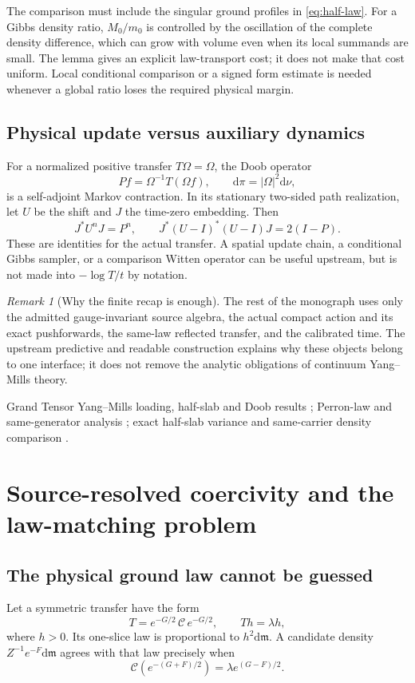 \documentclass[11pt,oneside,openany]{book}
\theoremstyle{definition}
\theoremstyle{remark}
\newtheorem{remark}[remark]{Remark}
\newcommand{\dd}{\mathrm d}
\newcommand{\src}[2]{\cite[#2]{#1}}
\newcommand{\sourcebasis}[1]{\par\smallskip\noindent #1\par}
\begin{document}
The comparison must include the singular ground profiles in
\cref{eq:half-law}. For a Gibbs density ratio, $M_0/m_0$ is controlled
by the oscillation of the complete density difference, which can grow
with volume even when its local summands are small. The lemma gives an
explicit law-transport cost; it does not make that cost uniform. Local
conditional comparison or a signed form estimate is needed whenever a
global ratio loses the required physical margin.

\section{Physical update versus auxiliary dynamics}
For a normalized positive transfer $T\Omega=\Omega$, the Doob operator
\[
Pf=\Omega^{-1}T(\Omega f),\qquad \dd\pi=|\Omega|^2\dd\nu,
\]
is a self-adjoint Markov contraction. In its stationary two-sided path realization, let $U$ be the shift and $J$ the time-zero embedding. Then
\begin{equation}\label{eq:koopman}
J^*U^nJ=P^n,\qquad
J^*(U-I)^*(U-I)J=2(I-P).
\end{equation}
These are identities for the actual transfer. A spatial update chain, a conditional Gibbs sampler, or a comparison Witten operator can be useful upstream, but is not made into $-\log T/t$ by notation.

\begin{remark}[Why the finite recap is enough]
The rest of the monograph uses only the admitted gauge-invariant source algebra, the actual compact action and its exact pushforwards, the same-law reflected transfer, and the calibrated time. The upstream predictive and readable construction explains why these objects belong to one interface; it does not remove the analytic obligations of continuum Yang--Mills theory.
\end{remark}
\sourcebasis{Grand Tensor Yang--Mills loading, half-slab and Doob results \cite{GT}; Perron-law and same-generator analysis \src{F1}{V7--V11, V21}; exact half-slab variance and same-carrier density comparison \src{F6}{V58}.}

\chapter{Source-resolved coercivity and the law-matching problem}
\label{ch:source}
\section{The physical ground law cannot be guessed}
Let a symmetric transfer have the form
\[
T=e^{-G/2}\,\mathcal C\,e^{-G/2},\qquad Th=\lambda h,
\]
where $h>0$. Its one-slice law is proportional to $h^2\dd\mathfrak m$. A candidate density $Z^{-1}e^{-F}\dd\mathfrak m$ agrees with that law precisely when
\begin{equation}\label{eq:law-incidence}
\mathcal C(e^{-(G+F)/2})=\lambda e^{(G-F)/2}.
\end{equation}
\end{document}
